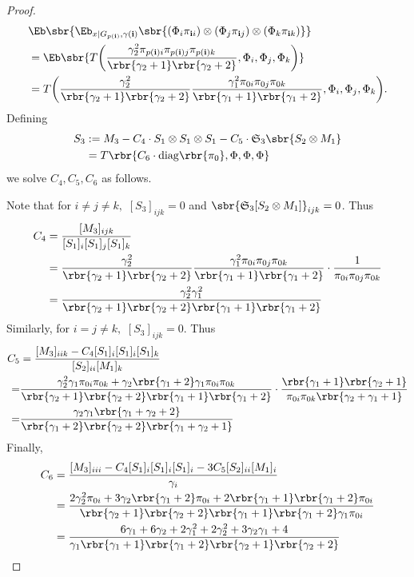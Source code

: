 \documentclass[twoside,11pt]{article}
\newcommand{\symm}{\mathfrak{S}}
\newcommand{\ib}{{\bf i}}
\begin{document}
{\begin{proof}
\begin{align}
\label{eq:moment_3}
	&\Eb \sbr{\Eb_{x|G_{p(\ib)}, \gamma(\ib)}\sbr{(\Phi_i \pi_{\ib i})\otimes (\Phi_j \pi_{\ib j})\otimes (\Phi_k \pi_{\ib k})}} \\
	&= \Eb \sbr{T \bigg( \frac{ \gamma_2^2   \pi_{p(\ib)i}  \pi_{p(\ib)j}  \pi_{p(\ib)k} }{ \rbr{\gamma_2+1}\rbr{\gamma_2+2}} , \Phi_i,\Phi_j,\Phi_k \bigg) }\\
	 &= T
        \bigg(\frac{\gamma_2^2}{\rbr{\gamma_2+1}\rbr{\gamma_2+2}}
        \frac{\gamma_1^2  \pi_{0i}  \pi_{0j}  \pi_{0k} }{
          \rbr{\gamma_1+1}\rbr{\gamma_1+2}}, \Phi_i,\Phi_j,\Phi_k \bigg).
\end{align}
Defining
\begin{align}
S_3 &:=  M_3 - C_4  \cdot S_1 \otimes S_1 \otimes S_1 -C_5  \cdot \symm_3\sbr{ S_2 \otimes M_1}\\
        &= T\rbr{    C_6 \cdot \mathrm{diag}\rbr{\pi_0} ,\Phi,\Phi,\Phi}
\end{align}
we solve $C_4, C_5, C_6$ as follows.

Note that for $i\neq j \neq k,$ $[S_3]_{ijk} = 0$ and $\sbr{\symm_3[S_2\otimes M_1]}_{ijk} = 0$. Thus
\begin{align}
	C_4 &= \frac{[M_3]_{ijk}}{[S_{1}]_i [S_{1}]_j [S_{1}]_k}\\
	&= \frac{\gamma_2^2}{\rbr{\gamma_2+1}\rbr{\gamma_2+2}}  \frac{\gamma_1^2 \pi_{0i}  \pi_{0j} \pi_{0k} }{ \rbr{\gamma_1+1}\rbr{\gamma_1+2}} \cdot \frac{1}{\pi_{0i}  \pi_{0j} \pi_{0k}}\\
	&=  \frac{\gamma_2^2 \gamma_1^2}{\rbr{\gamma_2+1}\rbr{\gamma_2+2}\rbr{\gamma_1+1}\rbr{\gamma_1+2}}\label{eq:c2}
\end{align}
Similarly, for $i = j \neq k,$ $[S_3]_{ijk} = 0$. Thus
\begin{align}
C_5 &= \frac{[M_3]_{iik} - C_4 [S_1]_i [S_1]_i [S_1]_k }{[S_2]_{ii}[{M_1}]_k}\\
=&\frac{\gamma_2^2 \gamma_1 \pi_{0i}  \pi_{0k} + \gamma_2 \rbr{\gamma_1+2} \gamma_1 \pi_{0i}  \pi_{0k}}{\rbr{\gamma_2+1}\rbr{\gamma_2+2} \rbr{\gamma_1+1}\rbr{\gamma_1+2}} \cdot \frac{ \rbr{\gamma_1+1}\rbr{\gamma_2+1}}{\pi_{0i}  \pi_{0k} \rbr{\gamma_2 +\gamma_1 + 1}}\\
=&\frac{\gamma_2\gamma_1\rbr{\gamma_1+\gamma_2+2}}{\rbr{\gamma_1+2}\rbr{\gamma_2+2}\rbr{\gamma_1+\gamma_2+1}}\label{eq:c3}
\end{align}
Finally, 
\begin{align}
C_6 &= \frac{[M_3]_{iii} - C_4[S_1]_i [S_1]_i [S_1]_i - 3 C_5[S_2]_{ii} [M_1]_i}{\gamma_i}\nonumber\\
&= \frac{2\gamma_2^2 \pi_{0i}  + 3\gamma_2\rbr{\gamma_1+2}\pi_{0i} + 2\rbr{\gamma_1+1}\rbr{\gamma_1+2}\pi_{0i}}{\rbr{\gamma_2+1}\rbr{\gamma_2+2} \rbr{\gamma_1+1} \rbr{\gamma_1 +2}\gamma_1 \pi_{0i}}\nonumber \\
&=  \frac{ 6\gamma_1 +6 \gamma_2 +2\gamma_1^2+ 2\gamma_2^2 +3 \gamma_2 \gamma_1 + 4 }{\gamma_1 \rbr{\gamma_1+1}\rbr{\gamma_1+2}\rbr{\gamma_2+1}\rbr{\gamma_2+2}}\label{eq:c4}
\end{align}
\end{proof}

}
\end{document}

